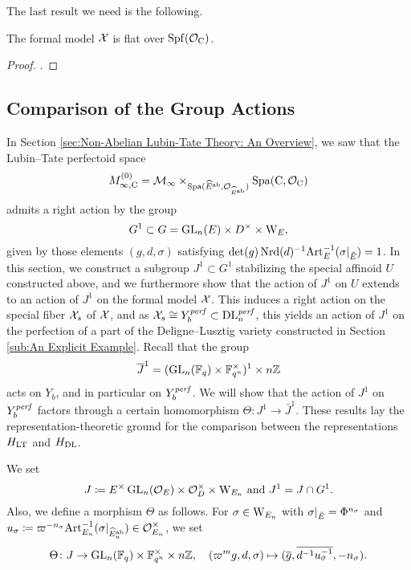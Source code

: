 \documentclass[../main.tex]{subfiles}
\begin{document}
The last result we need is the following.
\begin{prop}\label{prop:FlatnessOfFormalModel}
  The formal model $\mathcal{X}$ is flat over $\operatorname{Spf}(\mathcal{O}_{\mathrm{C}})$. 
\begin{proof}
  .
\end{proof}
\end{prop}



\subsection{Comparison of the Group Actions} %
\label{sub:Proof of Proposition}
In Section \ref{sec:Non-Abelian Lubin-Tate Theory: An Overview}, we saw that
the Lubin--Tate perfectoid space 
$$M_{\infty, {\mathrm{C}}}^{(0)} = \mathcal{M}_{\infty} \times_{\operatorname{Spa}(\widehat E^{\mathrm{ab}}, \mathcal{O}_{\widehat
E^{\mathrm{ab}}})} \operatorname{Spa}({\mathrm{C}}, \mathcal{O}_{\mathrm{C}})$$ 
admits a right action by the group
\begin{equation*}
  G^1 \subset G = \operatorname{GL}_n(E) \times D^\times \times \mathrm W_E,
\end{equation*}
given by those elements $(g,d,\sigma)$ satisfying $\det(g) \operatorname{Nrd}(d)^{-1} \mathrm{Art}_E^{-1}(\sigma|_{\breve {E}}) = 1$.
In this section, we construct a subgroup $J^1 \subset G^1$ stabilizing the
special affinoid $U$ constructed above, and we furthermore show that 
the action of $J^1$ on $U$ extends to an action of $J^1$ on the formal model
$\mathcal{X}$. This induces a right action on the special fiber
$\mathcal{X}_s$ of $\mathcal{X}$, and as $\mathcal{X}_s \cong Y_b^{\mathit{perf}} \subset \mathrm{DL}_n^{\mathit{perf}}$, this
yields an action of $J^1$ on the perfection of a part of the Deligne--Lusztig
variety constructed in Section \ref{sub:An Explicit Example}. Recall that the group 
\begin{equation*}
  \overline J^1 = (\operatorname{GL}_n(\mathbb{F}_q) \times \mathbb{F}_{q^n}^\times)^1 \times n\mathbb{Z}
\end{equation*}
acts on $Y_b$, and in particular on 
$Y_b^{\mathit{perf}}$. We will show that the action of $J^1$ on $Y_b^{\mathit{perf}}$
factors through a certain homomorphism $\Theta\colon J^1 \to \bar J^1$. These
results lay the representation-theoretic ground for the comparison between the
representations $H_{\mathrm{LT}}$ and $H_\mathrm{DL}$.

We set 
\begin{equation} \label{eq:defJandJ1}
  J \coloneqq E^\times \operatorname{GL}_n(\mathcal{O}_E) \times \mathcal{O}_D^\times \times \mathrm W_{E_n}
  \text{ and } J^1 = J \cap G^1.
\end{equation}
Also, we define a morphism $\Theta$ as follows. For $\sigma \in \mathrm W_{E_n}$ with
$\sigma|_{\breve {E}} = \Phi^{n_\sigma}$ and $u_\sigma \coloneq \varpi^{-n_\sigma}
\mathrm{Art}^{-1}_{E_n}(\sigma|_{\widehat E_n^{\mathrm{ab}}}) \in \mathcal{O}_{E_n}^\times$, we set
\begin{equation*}
  \Theta \colon J \to \operatorname{GL}_n(\mathbb{F}_q) \times \mathbb{F}_{q^n}^\times \times {n\mathbb{Z}}, \quad
  (\varpi^m g,d,\sigma) \mapsto (\overline g, \overline {d^{-1}u_\sigma^{-1}}, -n_\sigma).
\end{equation*}
\end{document}
